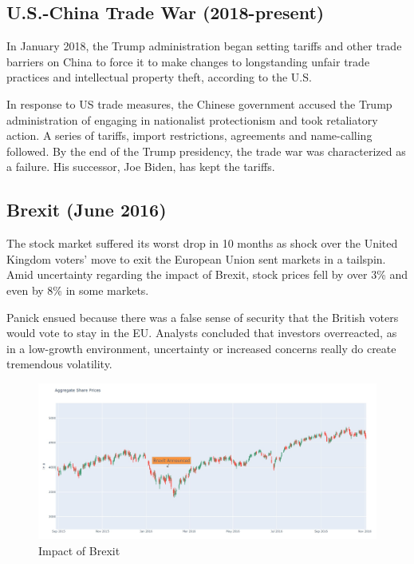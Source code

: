 \documentclass[11pt, twocolumn]{article}
\begin{document}
\begin{justify}
\subsection{U.S.-China Trade War (2018-present)}
In January 2018, the Trump administration began setting tariffs and other trade barriers on China to force it to make changes to longstanding unfair trade practices and intellectual property theft, according to the U.S. \vspace{1em}


In response to US trade measures, the Chinese government accused the Trump administration of engaging in nationalist protectionism and took retaliatory action. A series of tariffs, import restrictions, agreements and name-calling followed. By the end of the Trump presidency, the trade war was characterized as a failure. His successor, Joe Biden, has kept the tariffs.
\vspace{-5pt}

\subsection{Brexit (June 2016)}
The stock market suffered its worst drop in 10 months as shock over the United Kingdom voters' move to exit the European Union sent markets in a tailspin. Amid uncertainty regarding the
impact of Brexit, stock prices fell by over 3\% and even by 8\% in some markets.
\vspace{1em}


Panick ensued because there was a false sense of security that the British voters would vote to stay in the EU. Analysts concluded that investors overreacted, as in a low-growth environment, uncertainty or increased concerns really do create tremendous volatility.

\vspace{-5pt}

\begin{figure}[h]
  \centering
  \includegraphics[scale=0.23]{figs/brexit.jpg}
  \caption*{Impact of Brexit}
\end{figure}


\end{justify}
\end{document}
